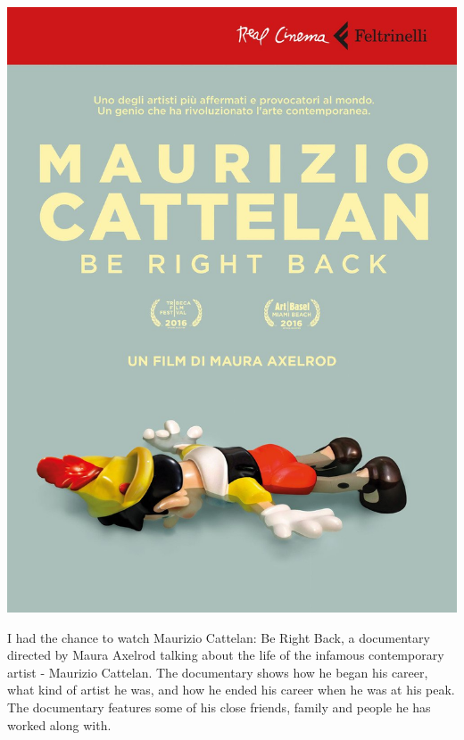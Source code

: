 \documentclass{article}
\begin{document}
\begin{minipage}{0.5\textwidth}\begin{flushright}	%
\includegraphics[scale = 0.05]{brb}		%
\hspace*{20px}										%
\end{flushright}\end{minipage}						%
\vspace{20px}										%


I had the chance to watch Maurizio Cattelan: Be Right Back, a documentary directed by Maura Axelrod talking about the life of the infamous contemporary artist - Maurizio Cattelan. The documentary shows how he began his career, what kind of artist he was, and how he ended his career when he was at his peak. The documentary features some of his close friends, family and people he has worked along with.
\end{document}
